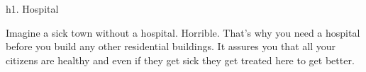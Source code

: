 h1. Hospital

Imagine a sick town without a hospital. Horrible. That's why you need a hospital before you build any other residential buildings. It assures you that all your citizens are healthy and even if they get sick they get treated here to get better.